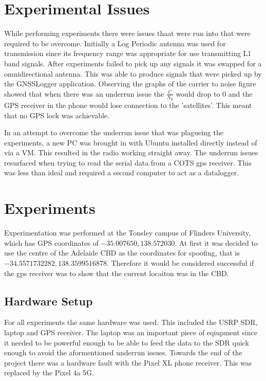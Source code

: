 \section{Experimental Issues}
While performing experiments there were issues thaat were run into that were required to be overcome. Initially a Log Periodic antenna was used for transmission since its
frequency range was appropriate for use transmitting L1 band signals. After experiments failed to pick up any signals it was swapped for a omnidirectional antenna. This
was able to produce signals that were picked up by the GNSSLogger application. Observing the graphs of the carrier to noise figure showed that when there was an underrun
issue the $\frac{C}{N_0}$ would drop to 0 and the GPS receiver in the phone would lose connection to the 'satellites'. This meant that no GPS lock was achievable.  

In an attempt to overcome the underrun issue that was plagueing the experiments, a new PC was brought in with Ubuntu installed directly instead of via a VM. This resulted
in the radio working straight away. The underrun issues resurfaced when trying to read the serial data from a COTS gps receiver. This was less than ideal and required a
second computer to act as a datalogger.

\section{Experiments}
Experimentation was performed at the Tonsley campus of Flinders University, which has GPS coordinates of $-35.007650, 138.572030$. At first it was decided to use the
centre of the Adelaide CBD as the coordinates for spoofing, that is $-34.5571732282, 138.3599516878$. Therefore it would be considered successful if the gps receiver was to show
that the current locaiton was in the CBD.

\subsection{Hardware Setup}
For all experiments the same hardware was used. This included the USRP SDR, laptop and GPS receiver. The laptop was an important piece of eqiupment since it needed to be
powerful enough to be able to feed the data to the SDR quick enough to avoid the aformentioned underrun issues. Towards the end of the project there was a hardware fault
with the Pixel XL phone receiver. This was replaced by the Pixel 4a 5G.

